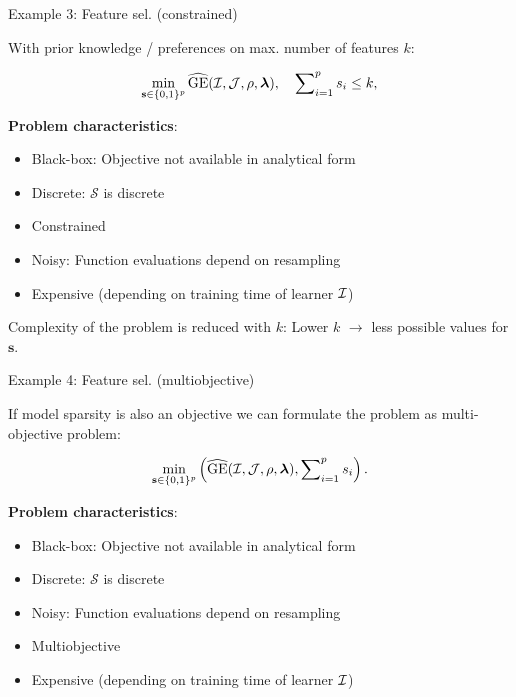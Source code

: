 \begin{vbframe}{Example 3: Feature sel. (constrained)}

With prior knowledge / preferences on max. number of features $k$:

\begin{eqnarray*}
\min_{\textbf{s} \in \{0, 1\}^p} \widehat{\text{GE}}(\mathcal{I}, \mathcal{J}, \rho, \bm{\lambda}), \quad \sum\nolimits_{i = 1}^p s_i \le k, 
\end{eqnarray*}

\lz 

\textbf{Problem characteristics}:
\begin{itemize}
	\item Black-box: Objective not available in analytical form
	\item Discrete: $\mathcal{S}$ is discrete
	\item Constrained 
	\item Noisy: Function evaluations depend on resampling	
	\item Expensive (depending on training time of learner $\mathcal{I}$)
\end{itemize}

\lz 

Complexity of the problem is reduced with $k$: Lower $k$ $\to$ less possible values for $\bm{s}$. 

\end{vbframe}

\begin{vbframe}{Example 4: Feature sel. (multiobjective)}

If model sparsity is also an objective we can formulate the problem as multi-objective problem: 

  \begin{eqnarray*}
    \min_{\textbf{s} \in \{0, 1\}^p} \left(\widehat{\text{GE}}(\mathcal{I}, \mathcal{J}, \rho, \bm{\lambda}), \sum\nolimits_{i = 1}^p s_i\right). 
  \end{eqnarray*}

\lz 

\textbf{Problem characteristics}:
\begin{itemize}
	\item Black-box: Objective not available in analytical form
	\item Discrete: $\mathcal{S}$ is discrete
	\item Noisy: Function evaluations depend on resampling	
	\item Multiobjective
	\item Expensive (depending on training time of learner $\mathcal{I}$)	
\end{itemize}

\end{vbframe}

